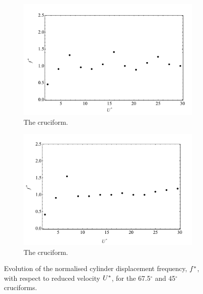 \documentclass[oneside]{utmthesis}
\begin{document}
\begin{figure}
  \centering
  \begin{subfigure}[h]{1\textwidth}
    \includegraphics[width=\textwidth]{figs/yStrFreq4}
    \caption{The \angfo{} cruciform.}
    \label{fig:yStrFreq4}
  \end{subfigure}
  
  \begin{subfigure}[h]{1\textwidth}
    \includegraphics[width=\textwidth]{figs/yStrFreq3}
    \caption{The \angth{} cruciform.}
    \label{fig:yStrFreq3}
  \end{subfigure}

  \caption{Evolution of the normalised cylinder displacement frequency, $f^{*}$, with respect to reduced velocity $U^{*}$, for the 67.5$^{\circ}$ and 45$^{\circ}$ cruciforms.}
  \label{fig:yStrFreq43}
\end{figure}
\end{document}
